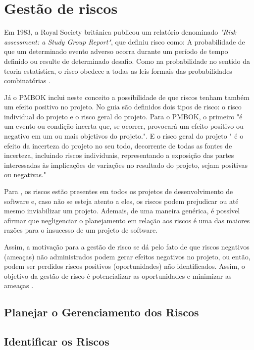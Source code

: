 \documentclass[
    12pt,       %
    openright,      %
    twoside,      %
    a4paper,      %
    english,      %
    french,       %
    spanish,      %
    brazil,       %
    ]{abntex2}
\begin{document}
\section{Gestão de riscos}

Em 1983, a Royal Society britânica publicou um relatório denominado \textit{"Risk assessment: a Study Group Report"}, que definiu risco como: A probabilidade de que um determinado evento adverso ocorra durante um período de tempo definido ou resulte de determinado desafio. Como na probabilidade no sentido da teoria estatística, o risco obedece a todas as leis formais das probabilidades combinatórias \cite{ADAMS:1995}. 

Já o PMBOK \cite{PMBOK:2017} inclui neste conceito a possibilidade de que riscos tenham também um efeito positivo no projeto. No guia são definidos dois tipos de risco: o risco individual do projeto e o risco geral do projeto. Para o PMBOK, o primeiro "é um evento ou condição incerta que, se ocorrer, provocará um efeito positivo ou
negativo em um ou mais objetivos do projeto.". E o risco geral do projeto " é o efeito da incerteza do projeto no seu todo, decorrente de todas as fontes de incerteza, incluindo riscos individuais, representando a exposição das partes interessadas às implicações de variações no resultado do projeto, sejam positivas ou negativas."

Para , os riscos estão presentes em todos os projetos de desenvolvimento de software e, caso não se esteja atento a eles, os riscos podem prejudicar ou até mesmo inviabilizar um projeto. Ademais, de uma maneira genérica, é possível afirmar que negligenciar o planejamento em relação aos riscos é uma das maiores razões para o insucesso de um projeto de software.

Assim, a motivação para a gestão de risco se dá pelo fato de que riscos negativos (ameaças) não administrados podem gerar efeitos negativos no projeto, ou então, podem ser perdidos riscos positivos (oportunidades) não identificados. Assim, o objetivo da gestão de risco é potencializar as oportunidades e minimizar as ameaças \cite{PMBOK:2017}.

\subsection{Planejar o Gerenciamento dos Riscos}
\subsection{Identificar os Riscos}
\end{document}
